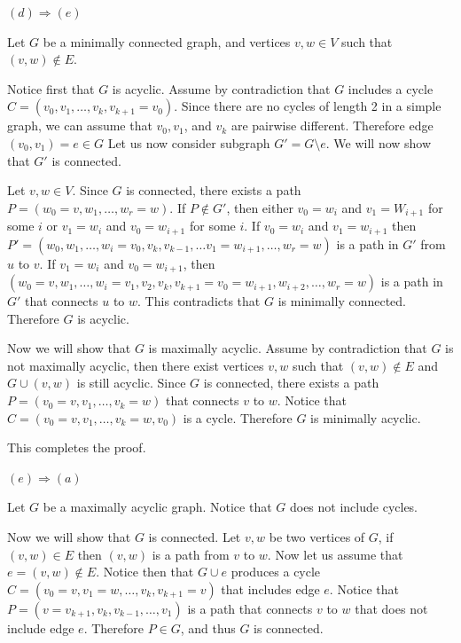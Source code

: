 \begin{enumerate}
        \vspace{1em}
        
        \underline{$(d) \Rightarrow (e)$}
        
        Let $G$ be a minimally connected graph, and vertices $v,w \in V$ such that $(v,w) \notin E$. 
        
        Notice first that $G$ is acyclic. Assume by contradiction that $G$ includes a cycle $C= (v_0, v_1, \ldots, v_k, v_{k+1}= v_0)$. Since there are no cycles of length 2 in a simple graph, we can assume that $v_0, v_1$, and $v_k$ are pairwise different. Therefore edge $(v_0,v_1) = e \in G$ Let us now consider subgraph $G'= G \setminus e$. We will now show that $G'$ is connected.
        
        Let $v,w \in V$. Since $G$ is connected, there exists a path $P= (w_0 = v,w_1, \ldots, w_r = w)$. If $P \notin G'$, then either $v_0 = w_i$ and $v_1 = W_{i+1}$ for some $i$ or $v_1 = w_i$ and $v_0=w_{i+1}$ for some $i$. If $v_0 = w_i$ and $v_1= w_{i+1}$ then $P'=(w_0,w_1, \ldots, w_i=v_0,v_k, v_{k-1}, \ldots v_1=w_{i+1}, \ldots, w_r=w)$ is a path in $G'$ from $u$ to $v$. If $v_1= w_i$ and $v_0 = w_{i+1}$, then $(w_0 = v,w_1, \ldots, w_i = v_1, v_2, v_k, v_{k+1}=v_0 = w_{i+1}, w_{i+2}, \ldots, w_r = w)$ is a path in $G'$ that connects $u$ to $w$. This contradicts that $G$ is minimally connected. Therefore $G$ is acyclic.
        
        Now we will show that $G$ is maximally acyclic. Assume by contradiction that $G$ is not maximally acyclic, then there exist vertices $v,w$ such that $(v,w) \notin E$ and $G \cup (v,w)$ is still acyclic. Since $G$ is connected, there exists a path $P=(v_0 = v, v_1, \ldots, v_k = w)$ that connects $v$ to $w$. Notice that $C= (v_0 = v, v_1, \ldots, v_k = w, v_0)$ is a cycle. Therefore $G$ is minimally acyclic.
        
        This completes the proof.
        
        \vspace{1em}
        
        \underline{$(e) \Rightarrow (a)$}
        
        Let $G$ be a maximally acyclic graph. Notice that $G$ does not include cycles.
        
        Now we will show that $G$ is connected. Let $v,w$ be two vertices of $G$, if $(v,w) \in E$ then $(v,w)$ is a path from $v$ to $w$. Now let us assume that $e=(v,w) \notin E$. Notice then that $G \cup e$ produces a cycle $C = (v_0=v, v_1=w, \ldots, v_k, v_{k+1}= v)$ that includes edge $e$. Notice that $P=(v=v_{k+1},v_k, v_{k-1}, \ldots,v_1)$ is a path that connects $v$ to $w$ that does not include edge $e$. Therefore $P \in G$, and thus $G$ is connected.
        

\end{enumerate}
